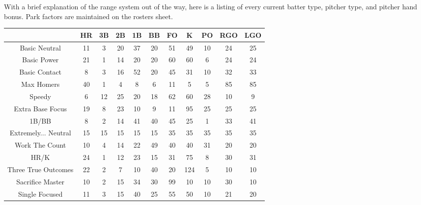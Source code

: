
With a brief explanation of the range system out of the way, 
here is a listing of every current batter type, pitcher type, and pitcher hand bonus. 
Park factors are maintained on the rosters sheet.

\begin{center}
	\begin{tabular}{|c|c|c|c|c|c|c|c|c|c|c|}
		\hline
		                     & HR & 3B & 2B & 1B & BB & FO & K   & PO & RGO & LGO    \\
		\hline 
		Basic Neutral        & 11 & 3  & 20 & 37 & 20 & 51 & 49  & 10 & 24  & 25     \\
		\hline
		Basic Power          & 21 & 1  & 14 & 20 & 20 & 60 & 60  & 6  & 24  & 24     \\
		\hline
		Basic Contact        & 8  & 3  & 16 & 52 & 20 & 45 & 31  & 10 & 32  & 33     \\
		\hline
		Max Homers           & 40 & 1  & 4  & 8  & 6  & 11 & 5   & 5  & 85  & 85     \\
		\hline
		Speedy               & 6  & 12 & 25 & 20 & 18 & 62 & 60  & 28 & 10  & 9      \\
		\hline
		Extra Base Focus     & 19 & 8  & 23 & 10 & 9  & 11 & 95  & 25 & 25  & 25     \\
		\hline
		1B/BB                & 8  & 2  & 14 & 41 & 40 & 45 & 25  & 1  & 33  & 41     \\
		\hline
		Extremely... Neutral & 15 & 15 & 15 & 15 & 15 & 35 & 35  & 35 & 35  & 35     \\
		\hline
		Work The Count       & 10 & 4  & 14 & 22 & 49 & 40 & 40  & 31 & 20  & 20     \\
		\hline
		HR/K                 & 24 & 1  & 12 & 23 & 15 & 31 & 75  & 8  & 30  & 31     \\
		\hline
		Three True Outcomes  & 22 & 2  & 7  & 10 & 40 & 20 & 124 & 5  & 10  & 10     \\
		\hline
		Sacrifice Master     & 10 & 2  & 15 & 34 & 30 & 99 & 10  & 10 & 30  & 10     \\
		\hline
		Single Focused       & 11 & 3  & 15 & 40 & 25 & 55 & 50  & 10 & 21  & 20     \\
		\hline
	\end{tabular}
\end{center}

